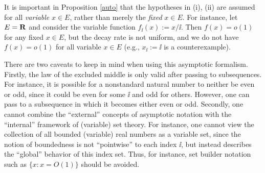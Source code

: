 \begin{remark} It is important in Proposition \ref{auto} that the hypotheses in (i), (ii) are assumed for all \emph{variable} $x \in E$, rather than merely the \emph{fixed} $x \in E$.  For instance, let $E = \mathbf{R}$ and consider the variable function $f_{\ii}(x) := x/\ii$.  Then $f(x) = o(1)$ for any fixed $x \in E$, but the decay rate is not uniform, and we do not have $f(x) = o(1)$ for all variable $x \in E$ (e.g., $x_\ii := \ii$ is a counterexample).
\end{remark}


\begin{remark} There are two caveats to keep in mind when using this asymptotic formalism.  Firstly, the law of the excluded middle is only valid after passing to subsequences.  For instance, it is possible for a nonstandard natural number to neither be even or odd, since it could be even for some $\ii$ and odd for others.  However, one can pass to a subsequence in which it becomes either even or odd.  Secondly, one cannot combine the ``external'' concepts of asymptotic notation with the ``internal'' framework of (variable) set theory.  For instance, one cannot view the collection of all bounded (variable) real numbers as a variable set, since the notion of boundedness is not ``pointwise'' to each index $\ii$, but instead describes the ``global'' behavior of this index set.  Thus, for instance, set builder notation such as $\{ x: x = O(1) \}$ should be avoided.
\end{remark}
